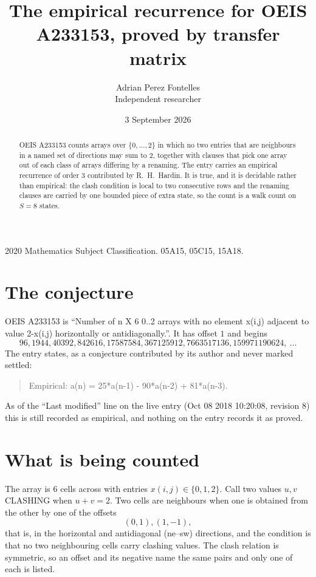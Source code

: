 \documentclass[11pt,a4paper]{article}
\title{The empirical recurrence for OEIS A233153, proved by transfer matrix}
\author{Adrian Perez Fontelles\\ \small Independent researcher}
\date{3 September 2026}
\theoremstyle{plain}
\theoremstyle{definition}
\begin{document}
\maketitle

\begin{abstract}
OEIS A233153 counts arrays over $\{0,\dots,2\}$ in which no two entries that are neighbours in
a named set of directions may sum to $2$, together with clauses that pick one array out of
each class of arrays differing by a renaming. The entry carries an empirical recurrence of
order $3$ contributed by R.~H.~Hardin. It is true, and it is decidable rather than
empirical: the clash condition is local to two consecutive rows and the renaming clauses are
carried by one bounded piece of extra state, so the count is a walk count on $S=8$ states.
\end{abstract}

\noindent\small 2020 Mathematics Subject Classification. 05A15, 05C15, 15A18.\normalsize

\section{The conjecture}

OEIS A233153 is ``Number of n X 6 0..2 arrays with no element x(i,j) adjacent to value 2-x(i,j) horizontally or antidiagonally.''. It has offset $1$ and begins
\[
96, 1944, 40392, 842616, 17587584, 367125912, 7663517136, 159971190624,\ \dots
\]
The entry states, as a conjecture contributed by its author and never marked settled:
\begin{quote}
Empirical: a(n) = 25*a(n-1) - 90*a(n-2) + 81*a(n-3).
\end{quote}
As of the ``Last modified'' line on the live entry (Oct 08 2018 10:20:08, revision 8) this is still
recorded as empirical, and nothing on the entry records it as proved.

\section{What is being counted}

The array is $6$ cells across with entries $x(i,j)\in\{0,1,2\}$. Call two values $u,v$ CLASHING
when $u+v=2$. Two cells are neighbours when one is obtained from the other by one of
the offsets
\[
(0,1), (1,-1),
\]
that is, in the horizontal and antidiagonal (ne--sw) directions, and the condition is that no two neighbouring cells carry
clashing values. The clash relation is symmetric, so an offset and its negative name the
same pairs and only one of each is listed.
\end{document}
